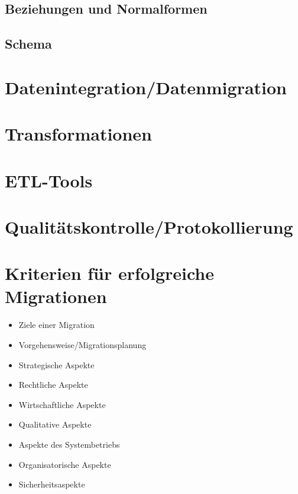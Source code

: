 \subsection{Beziehungen und Normalformen}
\subsection{Schema}

\section{Datenintegration/Datenmigration}

\section{Transformationen}

\section{ETL-Tools}

\section{Qualitätskontrolle/Protokollierung}

\section{Kriterien für erfolgreiche Migrationen}
\begin{itemize}

  \item Ziele einer Migration
  \item Vorgehensweise/Migrationsplanung
  \item Strategische Aspekte
  \item Rechtliche Aspekte
  \item Wirtschaftliche Aspekte
  \item Qualitative Aspekte
  \item Aspekte des Systembetriebs
  \item Organisatorische Aspekte
  \item Sicherheitsaspekte
\end{itemize}
